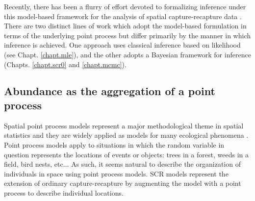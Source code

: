 Recently, there has been a flurry of effort devoted to formalizing
inference under this model-based framework for the analysis of spatial
capture-recapture data
\citep{borchers_efford:2008,
royle_gardner:2011,borchers:2011,gopalaswamy:2012}.  There are
two distinct lines of work which adopt the model-based formulation in
terms of the underlying point process but differ primarily by the
manner in which inference is achieved. One approach
\citep{borchers_efford:2008} uses classical inference based on
likelihood (see Chapt. \ref{chapt.mle}), and the other
\citep{royle_young:2008} adopts a Bayesian framework for inference
(Chapts. \ref{chapt.scr0} and \ref{chapt.mcmc}).

\subsection{Abundance as the aggregation of a point process}

Spatial point process models represent a major methodological theme in
spatial statistics \citep{cressie:1992} and they are widely applied as
models for many ecological phenomena
\citep{stoyan_penttinen:2000,illian_etal:2008}. Point process models
apply to situations in which the random variable in question
represents the locations of events or objects: trees in a forest,
weeds in a field, bird nests, etc$\dots$  As such, it seems natural to
describe the organization of individuals in space using point process
models. SCR models represent the extension of ordinary
capture-recapture by augmenting the model with a point process to
describe individual locations.


